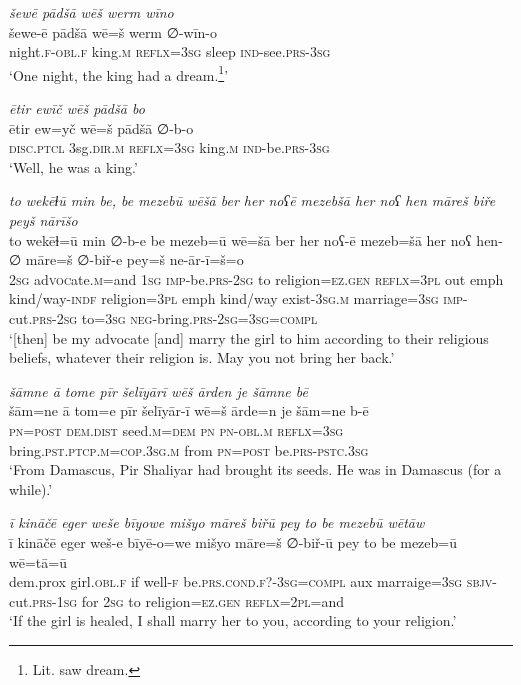 \ea \label{ZP.30}
\textit{šewē pādšā wēš werm wīno} \\ 
\gll šewe-ē pādšā wē=š werm ∅-wīn-o \\ 
 night\textsc{.f}\textsc{-obl}\textsc{.f} king\textsc{.m} \textsc{reflx}\textsc{=3sg} sleep \textsc{ind-}see\textsc{.prs}\textsc{-3sg} \\ 
\glt `One night, the king had a dream.\footnote{Lit. saw dream.}'
\z 
 
\ea \label{ZP.35}
\textit{ētir ewīč wēš pādšā bo} \\ 
\gll ētir ew=yč wē=š pādšā ∅-b-o \\ 
 \textsc{disc.ptcl} 3sg\textsc{.dir}\textsc{.m} \textsc{reflx}\textsc{=3sg} king\textsc{.m} \textsc{ind-}be\textsc{.prs}\textsc{-3sg} \\ 
\glt `Well, he was a king.'
\z 
 
\ea \label{ZP.47}
\textit{to wekēɫū min be, be mezebū wēšā ber her noʕē mezebšā her noʕ hen māreš biře peyš nārīšo} \\ 
\gll to wekēɫ=ū min ∅-b-e be mezeb=ū wē=šā ber her noʕ-ē mezeb=šā her noʕ hen-∅ māre=š ∅-biř-e pey=š ne-ār-ī=š=o \\ 
 \textsc{2sg} ad\textsc{voc}ate\textsc{.m}=and \textsc{1sg} \textsc{imp-}be\textsc{.prs}-\textsc{2sg} to religion\textsc{\textsc{=ez.gen}} \textsc{reflx}\textsc{=3pl} out emph kind/way\textsc{-indf} religion\textsc{=3pl} emph kind/way exist\textsc{-3sg}\textsc{.m} marriage\textsc{=3sg} \textsc{imp-}cut\textsc{.prs}-\textsc{2sg} to\textsc{=3sg} \textsc{neg-}bring\textsc{.prs}\textsc{-2sg}\textsc{=3sg}\textsc{=compl} \\ 
\glt `[then] be my advocate [and] marry the girl to him according to their religious beliefs, whatever their religion is. May you not bring her back.'
\z 
 
\ea \label{ZP.95}
\textit{šāmne ā tome pīr šelīyārī wēš ārden je šāmne bē} \\ 
\gll šām=ne ā tom=e pīr šelīyār-ī wē=š ārde=n je šām=ne b-ē \\ 
 \textsc{pn}\textsc{=\textsc{post}} \textsc{dem.dist} seed\textsc{.m}\textsc{=dem} \textsc{pn} \textsc{pn}\textsc{-obl}\textsc{.m} \textsc{reflx}\textsc{=3sg} bring\textsc{.pst}\textsc{.ptcp}\textsc{.m}\textsc{=cop}\textsc{.3sg}\textsc{.m} from \textsc{pn}\textsc{=\textsc{post}} be\textsc{.prs}\textsc{-pstc}\textsc{.3sg} \\ 
\glt `From Damascus, Pir Shaliyar had brought its seeds. He was in Damascus (for a while).'
\z 
 
\ea \label{ZP.100}
\textit{ī kināčē eger weše bīyowe mišyo māreš biřū pey to be mezebū wētāw} \\ 
\gll ī kināčē eger weš-e bīyē-o=we mišyo māre=š ∅-biř-ū pey to be mezeb=ū wē=tā=ū \\ 
 dem.prox girl\textsc{.obl}\textsc{.f} if well\textsc{-f} be\textsc{.prs}.\textsc{cond}\textsc{.f}?\textsc{-3sg}\textsc{=compl} aux marraige\textsc{=3sg} \textsc{sbjv-}cut\textsc{.prs}\textsc{-\textsc{1sg}} for \textsc{2sg} to religion\textsc{\textsc{=ez.gen}} \textsc{reflx}=\textsc{2pl}=and \\ 
\glt `If the girl is healed, I shall marry her to you, according to your religion.'
\z 
 

